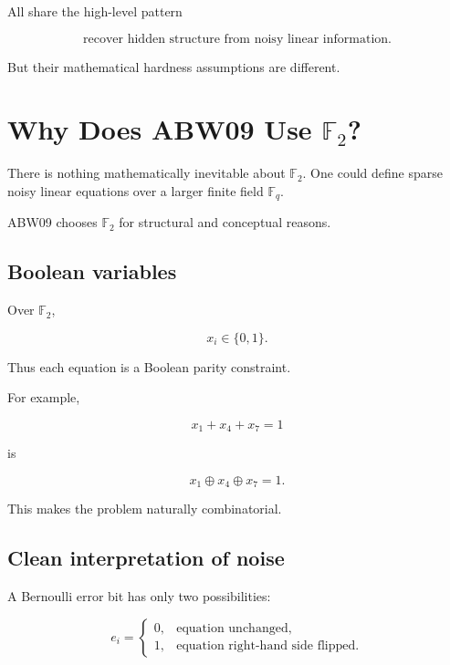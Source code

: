 \documentclass[11pt,a4paper]{article}
\newcommand{\F}{\mathbb{F}}
\begin{document}
All share the high-level pattern

\begin{equation}
    \boxed{\text{recover hidden structure from noisy linear information}.}
\end{equation}

But their mathematical hardness assumptions are different.

\section[Why Does ABW09 Use F2?]{Why Does ABW09 Use $\F_2$?}

There is nothing mathematically inevitable about $\F_2$.
One could define sparse noisy linear equations over a larger finite
field $\F_q$.

ABW09 chooses $\F_2$ for structural and conceptual reasons.

\subsection{Boolean variables}

Over $\F_2$,

\begin{equation}
    x_i\in\{0,1\}.
\end{equation}

Thus each equation is a Boolean parity constraint.

For example,

\begin{equation}
    x_1+x_4+x_7=1
\end{equation}

is

\begin{equation}
    x_1\oplus x_4\oplus x_7=1.
\end{equation}

This makes the problem naturally combinatorial.

\subsection{Clean interpretation of noise}

A Bernoulli error bit has only two possibilities:

\begin{equation}
e_i=
\begin{cases}
0,&\text{equation unchanged},\\
1,&\text{equation right-hand side flipped}.
\end{cases}
\end{equation}
\end{document}
